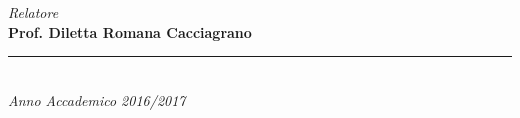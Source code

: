 \begin{titlepage}
\begin{minipage}[t]{0.47\textwidth}
\begin{center}
    \end{center}
\end{minipage}
\hfill
\begin{minipage}[t]{0.47\textwidth}
    \begin{center}
    {\LARGE{\textsl{Relatore}
    \vspace{0.2cm}\\
    \bf Prof. Diletta Romana Cacciagrano\\
    }}

    \end{center}
\end{minipage}
\vspace{35mm}
\begin{center}
\rule[0.1cm]{14cm}{0.1mm}\\
\vspace{2mm}
{\Large{\textsl{Anno Accademico 2016/2017}}}
\end{center}
\end{titlepage}
\restoregeometry
\clearpage
\cleardoublepage

